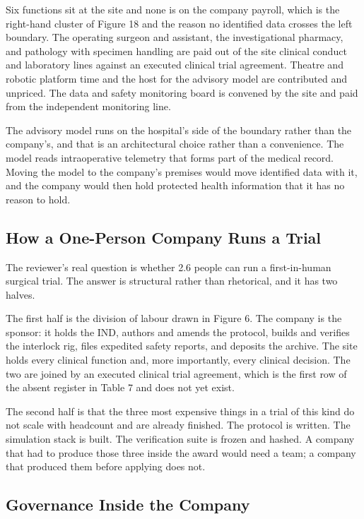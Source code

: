 Six functions sit at the site and none is on the company payroll, which is the
right-hand cluster of Figure 18 and the reason no identified data crosses the
left boundary. The operating
surgeon and assistant, the investigational pharmacy, and pathology with specimen
handling are paid out of the site clinical conduct and laboratory lines against
an executed clinical trial agreement. Theatre and robotic platform time and the
host for the advisory model are contributed and unpriced. The data and safety
monitoring board is convened by the site and paid from the independent
monitoring line.

The advisory model runs on the hospital's side of the boundary rather than the
company's, and that is an architectural choice rather than a convenience. The
model reads intraoperative telemetry that forms part of the medical record.
Moving the model to the company's premises would move identified data with it,
and the company would then hold protected health information that it has no
reason to hold.

\subsection{How a One-Person Company Runs a Trial}

The reviewer's real question is whether 2.6 people can run a first-in-human
surgical trial. The answer is structural rather than rhetorical, and it has two
halves.

The first half is the division of labour drawn in Figure 6. The company is the
sponsor: it holds the IND, authors and amends the protocol, builds and verifies
the interlock rig, files expedited safety reports, and deposits the archive. The
site holds every clinical function and, more importantly, every clinical
decision. The two are joined by an executed clinical trial agreement, which is
the first row of the absent register in Table 7 and does not yet exist.

The second half is that the three most expensive things in a trial of this kind
do not scale with headcount and are already finished. The protocol is written.
The simulation stack is built. The verification suite is frozen and hashed. A
company that had to produce those three inside the award would need a team; a
company that produced them before applying does not.

\subsection{Governance Inside the Company}


